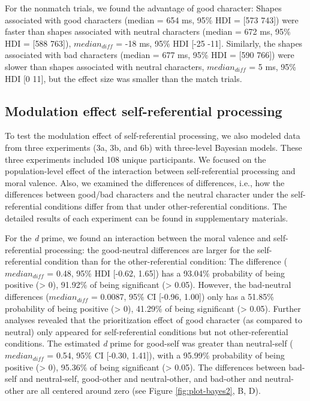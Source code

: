 \documentclass[
  man]{apa6}
\begin{document}
For the nonmatch trials, we found the advantage of good character: Shapes associated with good characters (median = 654 ms, 95\% HDI = {[}573 743{]}) were faster than shapes associated with neutral characters (median = 672 ms, 95\% HDI = {[}588 763{]}), \(median_{diff}\) = -18 ms, 95\% HDI {[}-25 -11{]}. Similarly, the shapes associated with bad characters (median = 677 ms, 95\% HDI = {[}590 766{]}) were slower than shapes associated with neutral characters, \(median_{diff}\) = 5 ms, 95\% HDI {[}0 11{]}, but the effect size was smaller than the match trials.

\hypertarget{modulation-effect-self-referential-processing}{%
\subsection{Modulation effect self-referential processing}\label{modulation-effect-self-referential-processing}}

To test the modulation effect of self-referential processing, we also modeled data from three experiments (3a, 3b, and 6b) with three-level Bayesian models. These three experiments included 108 unique participants. We focused on the population-level effect of the interaction between self-referential processing and moral valence. Also, we examined the differences of differences, i.e., how the differences between good/bad characters and the neutral character under the self-referential conditions differ from that under other-referential conditions. The detailed results of each experiment can be found in supplementary materials.

For the \emph{d} prime, we found an interaction between the moral valence and self-referential processing: the good-neutral differences are larger for the self-referential condition than for the other-referential condition: The difference (\(median_{diff}\) = 0.48, 95\% HDI {[}-0.62, 1.65{]}) has a 93.04\% probability of being positive (\textgreater{} 0), 91.92\% of being significant (\textgreater{} 0.05). However, the bad-neutral differences (\(median_{diff}\) = 0.0087, 95\% CI {[}-0.96, 1.00{]}) only has a 51.85\% probability of being positive (\textgreater{} 0), 41.29\% of being significant (\textgreater{} 0.05). Further analyses revealed that the prioritization effect of good character (as compared to neutral) only appeared for self-referential conditions but not other-referential conditions. The estimated \emph{d} prime for good-self was greater than neutral-self (\(median_{diff}\) = 0.54, 95\% CI {[}-0.30, 1.41{]}), with a 95.99\% probability of being positive (\textgreater{} 0), 95.36\% of being significant (\textgreater{} 0.05). The differences between bad-self and neutral-self, good-other and neutral-other, and bad-other and neutral-other are all centered around zero (see Figure \ref{fig:plot-bayes2}, B, D).
\end{document}

